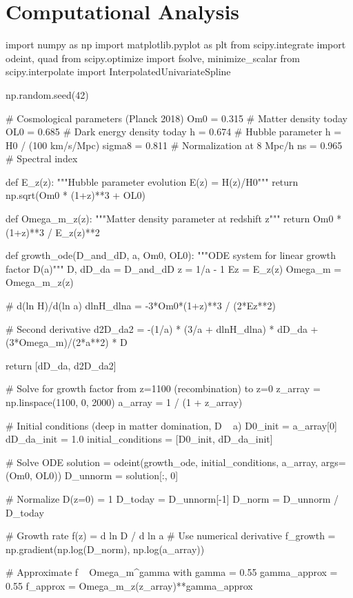 \documentclass[a4paper, 11pt]{article}
\begin{document}
\section{Computational Analysis}

\begin{pycode}
import numpy as np
import matplotlib.pyplot as plt
from scipy.integrate import odeint, quad
from scipy.optimize import fsolve, minimize_scalar
from scipy.interpolate import InterpolatedUnivariateSpline

np.random.seed(42)

# Cosmological parameters (Planck 2018)
Om0 = 0.315        # Matter density today
OL0 = 0.685        # Dark energy density today
h = 0.674          # Hubble parameter h = H0 / (100 km/s/Mpc)
sigma8 = 0.811     # Normalization at 8 Mpc/h
ns = 0.965         # Spectral index

def E_z(z):
    """Hubble parameter evolution E(z) = H(z)/H0"""
    return np.sqrt(Om0 * (1+z)**3 + OL0)

def Omega_m_z(z):
    """Matter density parameter at redshift z"""
    return Om0 * (1+z)**3 / E_z(z)**2

def growth_ode(D_and_dD, a, Om0, OL0):
    """ODE system for linear growth factor D(a)"""
    D, dD_da = D_and_dD
    z = 1/a - 1
    Ez = E_z(z)
    Omega_m = Omega_m_z(z)

    # d(ln H)/d(ln a)
    dlnH_dlna = -3*Om0*(1+z)**3 / (2*Ez**2)

    # Second derivative
    d2D_da2 = -(1/a) * (3/a + dlnH_dlna) * dD_da + (3*Omega_m)/(2*a**2) * D

    return [dD_da, d2D_da2]

# Solve for growth factor from z=1100 (recombination) to z=0
z_array = np.linspace(1100, 0, 2000)
a_array = 1 / (1 + z_array)

# Initial conditions (deep in matter domination, D ~ a)
D0_init = a_array[0]
dD_da_init = 1.0
initial_conditions = [D0_init, dD_da_init]

# Solve ODE
solution = odeint(growth_ode, initial_conditions, a_array, args=(Om0, OL0))
D_unnorm = solution[:, 0]

# Normalize D(z=0) = 1
D_today = D_unnorm[-1]
D_norm = D_unnorm / D_today

# Growth rate f(z) = d ln D / d ln a
# Use numerical derivative
f_growth = np.gradient(np.log(D_norm), np.log(a_array))

# Approximate f ~ Omega_m^gamma with gamma = 0.55
gamma_approx = 0.55
f_approx = Omega_m_z(z_array)**gamma_approx


\end{pycode}
\end{document}
